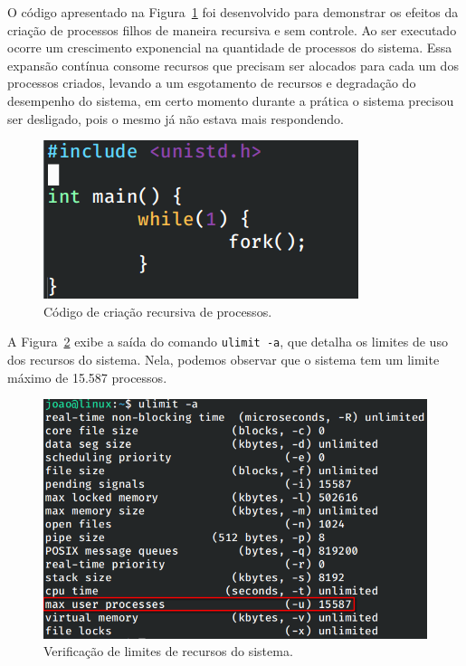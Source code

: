 \documentclass[
	12pt,				%
	oneside,   	        %
	a4paper,			%
	english,			%
	french,				%
	spanish,			%
	brazil,				%
	]{pacotes/abntex2}
\begin{document}
O código apresentado na Figura~\ref{fig:fork} foi desenvolvido para demonstrar os efeitos da criação de processos filhos de maneira recursiva e sem controle. Ao ser executado ocorre um crescimento exponencial na quantidade de processos do sistema. Essa expansão contínua consome recursos que precisam ser alocados para cada um dos processos criados, levando a um esgotamento de recursos e degradação do desempenho do sistema, em certo momento durante a prática o sistema precisou ser desligado, pois o mesmo já não estava mais respondendo.

\begin{figure}[H]
  \centering
  \includegraphics[scale=0.5]{figuras/fork.png}
  \caption{Código de criação recursiva de processos.}
  \label{fig:fork}
\end{figure}

A Figura~\ref{fig:ulimit} exibe a saída do comando \texttt{ulimit -a}, que detalha os limites de uso dos recursos do sistema. Nela, podemos observar que o sistema tem um limite máximo de 15.587 processos. 

\begin{figure}[H]
  \centering
  \includegraphics[scale=0.5]{figuras/ulimit.png}
  \caption{Verificação de limites de recursos do sistema.}
  \label{fig:ulimit}
\end{figure}
\end{document}
